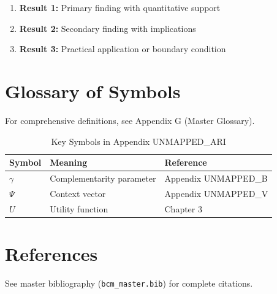 \begin{enumerate}
    \item \textbf{Result 1:} Primary finding with quantitative support
    \item \textbf{Result 2:} Secondary finding with implications
    \item \textbf{Result 3:} Practical application or boundary condition
\end{enumerate}

\section{Glossary of Symbols}
\label{sec:ari-glossary}

For comprehensive definitions, see Appendix G (Master Glossary).

\begin{table}[htbp]
\centering
\caption{Key Symbols in Appendix UNMAPPED_ARI}
\begin{tabular}{lll}
\toprule
\textbf{Symbol} & \textbf{Meaning} & \textbf{Reference} \\
\midrule
$\gamma$ & Complementarity parameter & Appendix UNMAPPED_B \\
$\Psi$ & Context vector & Appendix UNMAPPED_V \\
$U$ & Utility function & Chapter 3 \\
\bottomrule
\end{tabular}
\end{table}


\section{References}
\label{sec:ari-references}

See master bibliography (\texttt{bcm\_master.bib}) for complete citations.

\nocite{bcm_master}

